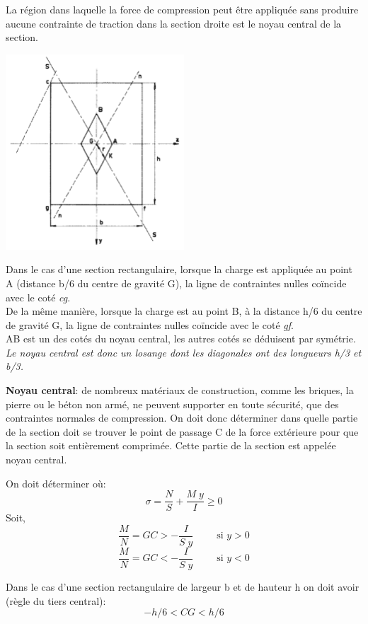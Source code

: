 \documentclass[a4paper]{article}
\begin{document}
La région dans laquelle la force de compression peut être appliquée sans produire aucune contrainte de traction dans la section droite est le noyau central de la section.
\begin{center}
\includegraphics[width=0.5\textwidth]{images/noyaucentral.PNG}
\end{center}
Dans le cas d'une section rectangulaire, lorsque la charge est appliquée au point A (distance b/6 du centre de gravité G), la ligne de contraintes nulles coïncide avec le coté \emph{cg}. \\
De la même manière, lorsque la charge est au point B, à la distance h/6 du centre de gravité G, la ligne de contraintes nulles coïncide avec le coté \emph{gf}. \\
AB est un des cotés du noyau central, les autres cotés se déduisent par symétrie. \textit{Le noyau central est donc un losange dont les diagonales ont des longueurs h/3 et b/3.}


\begin{siderules}
\textbf{Noyau central}: de nombreux matériaux de construction, comme les briques, la pierre ou le béton non armé, ne peuvent supporter en toute sécurité, que des contraintes normales de compression. On doit donc déterminer dans quelle partie de la section doit se trouver le point de passage C de la force extérieure pour que la section soit entièrement comprimée. Cette partie de la section est appelée noyau central.

On doit déterminer où:
\[ \sigma = \frac{N}{S} + \frac{M \; y}{I} \geq 0 \]
Soit,
\[ \frac{M}{N} = GC > - \frac{I}{S \; y} \qquad \text{ si } y > 0 \]
\[ \frac{M}{N} = GC < - \frac{I}{S \; y} \qquad \text{ si } y < 0 \]

Dans le cas d’une section rectangulaire de largeur b et de hauteur h on doit avoir (règle du tiers central):
\[ -h/6 < CG < h/6 \]
\end{siderules}
\end{document}
